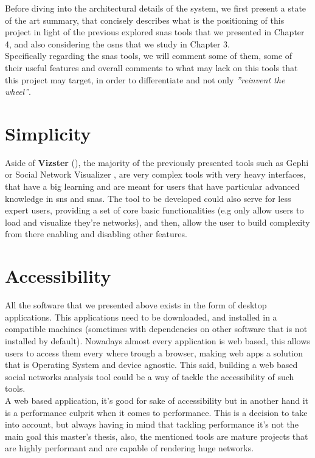 Before diving into the architectural details of the system, we first present a state of the art summary, that concisely describes what is the positioning of this project in light of the previous explored \glspl{sna} tools that we presented in Chapter 4, and also considering the \glspl{osn} that we study in Chapter 3.\\
\indent Specifically regarding the \glspl{sna} tools, we will comment some of them, some of their useful features and overall comments to what may lack on this tools that this project may target, in order to differentiate and not only \textit{''reinvent the wheel''}.\\

\section{Simplicity}
Aside of \textbf{Vizster} (\cite{heer2005vizster}), the majority of the previously presented tools such as Gephi \cite{bastian2009gephi} or Social Network Visualizer \cite{socnetv}, are very complex tools with very heavy interfaces, that have a big learning and are meant for users that have particular advanced knowledge in \glspl{sn} and \glspl{sna}. The tool to be developed could also serve for less expert users, providing a set of core basic functionalities (e.g only allow users to load and visualize they're networks), and then, allow the user to build complexity from there enabling and disabling other features.

\section{Accessibility}
All the software that we presented above exists in the form of desktop applications. This applications need to be downloaded, and installed in a compatible machines (sometimes with dependencies on other software that is not installed by default). Nowadays almost every application is web based, this allows users to access them every where trough a browser, making web apps a solution that is Operating System and device agnostic. This said, building a web based social networks analysis tool could be a way of tackle the accessibility of such tools.\\
\indent A web based application, it's good for sake of accessibility but in another hand it is a performance culprit when it comes to performance. This is a decision to take into account, but always having in mind that tackling performance it's not the main goal this master's thesis, also, the mentioned tools are mature projects that are highly performant and are capable of rendering huge networks.

